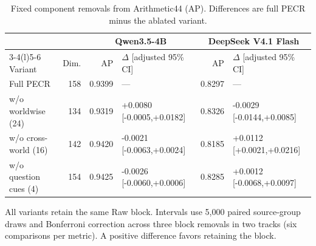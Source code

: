 \begin{table}[t]
\centering\small
\caption{Fixed component removals from Arithmetic44 (AP). Differences are full PECR minus the ablated variant.}
\label{tab:ablation-ap}
\setlength{\tabcolsep}{4pt}
\begin{tabular}{@{}lrrlrl@{}}
\toprule
& & \multicolumn{2}{c}{Qwen3.5-4B} & \multicolumn{2}{c}{DeepSeek V4.1 Flash}\\\cmidrule(lr){3-4}\cmidrule(l){5-6} Variant & Dim. & AP & $\Delta$ [adjusted 95\% CI] & AP & $\Delta$ [adjusted 95\% CI]\\
\midrule
Full PECR & 158 & 0.9399 & --- & 0.8297 & ---\\
w/o worldwise (24) & 134 & 0.9319 & +0.0080 [-0.0005,+0.0182] & 0.8326 & -0.0029 [-0.0144,+0.0085]\\
w/o cross-world (16) & 142 & 0.9420 & -0.0021 [-0.0063,+0.0024] & 0.8185 & +0.0112 [+0.0021,+0.0216]\\
w/o question cues (4) & 154 & 0.9425 & -0.0026 [-0.0060,+0.0006] & 0.8285 & +0.0012 [-0.0068,+0.0097]\\
\bottomrule
\end{tabular}
\par\vspace{3pt}\begin{minipage}{\textwidth}\footnotesize All variants retain the same Raw block. Intervals use 5,000 paired source-group draws and Bonferroni correction across three block removals in two tracks (six comparisons per metric). A positive difference favors retaining the block.\end{minipage}
\end{table}

